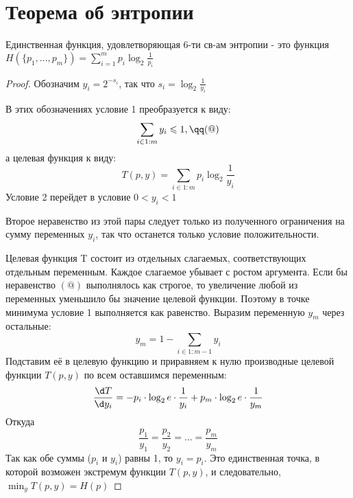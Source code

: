 \documentclass[discrete.tex]{subfiles}
\begin{document}
  \section{Теорема об энтропии}

  \begin{theorem}
    Единственная функция, удовлетворяющая 6-ти св-ам энтропии - это функция $H(\{p_1,...,p_m\}) = \sum_{i=1}^m p_i \log_2 \frac{1}{p_i}$
  \end{theorem}

  \begin{proof}
    Обозначим $y_i=2^{-s_i}$, так что $s_i=\log_2 \frac{1}{y_i}$

    В этих обозначениях условие 1 преобразуется к виду:
    \[\sum_{i \in 1:m} y_i \leqslant 1, \qq (@)\]
    а целевая функция к виду:
    \[T(p,y) = \sum_{i \in 1:m} p_i \log_2 \frac{1}{y_i}\]
    Условие 2 перейдет в условие $0 < y_i < 1$

    Второе неравенство из этой пары следует только из полученного ограничения на сумму переменных $y_i$, так что останется только условие положительности.

    Целевая функция T состоит из отдельных слагаемых, соответствующих отдельным переменным. Каждое слагаемое убывает с ростом аргумента. Если бы неравенство  $(@)$ выполнялось как строгое, то увеличение любой из переменных уменьшило бы значение целевой функции. Поэтому в точке минимума условие 1 выполняется как равенство. Выразим переменную $y_m$ через остальные:
    \[y_m = 1 - \sum_{i \in 1 : m-1} y_i\]
    Подставим её в целевую функцию и приравняем к нулю производные целевой функции $T(p,y)$ по всем оставшимся переменным:
    \[\dfrac{\d T}{\d y_i} = -p_i \cdot \log_2 e \cdot \frac{1}{y_i} + p_m \cdot \log_2 e \cdot \frac{1}{y_m}\]
    Откуда
    \[\frac{p_1}{y_1} = \frac{p_2}{y_2} = ... = \frac{p_m}{y_m}\]
    Так как обе суммы ($p_i$ и $y_i$) равны 1, то $y_i=p_i$. Это единственная точка, в которой возможен экстремум функции $T(p,y)$, и следовательно, $\min_y T(p,y) = H(p)$
  \end{proof}
\end{document}

